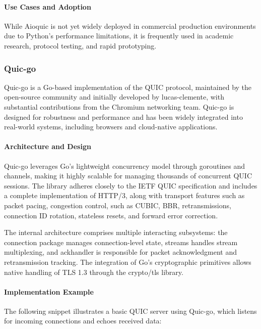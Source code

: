 \paragraph{Use Cases and Adoption}
While Aioquic is not yet widely deployed in commercial production environments due to Python's performance limitations, it is frequently used in academic research, protocol testing, and rapid prototyping.

\subsubsection{Quic-go}
Quic-go is a Go-based implementation of the QUIC protocol, maintained by the open-source community and initially developed by lucas-clemente, with substantial contributions from the Chromium networking team. Quic-go is designed for robustness and performance and has been widely integrated into real-world systems, including browsers and cloud-native applications.

\paragraph{Architecture and Design}
Quic-go leverages Go's lightweight concurrency model through goroutines and channels, making it highly scalable for managing thousands of concurrent QUIC sessions. The library adheres closely to the IETF QUIC specification and includes a complete implementation of HTTP/3, along with transport features such as packet pacing, congestion control, such as CUBIC, BBR, retransmissions, connection ID rotation, stateless resets, and forward error correction.

The internal architecture comprises multiple interacting subsystems: the connection package manages connection-level state, streams handles stream multiplexing, and ackhandler is responsible for packet acknowledgment and retransmission tracking. The integration of Go's cryptographic primitives allows native handling of TLS 1.3 through the crypto/tls library.

\paragraph{Implementation Example}
The following snippet illustrates a basic QUIC server using Quic-go, which listens for incoming connections and echoes received data:

